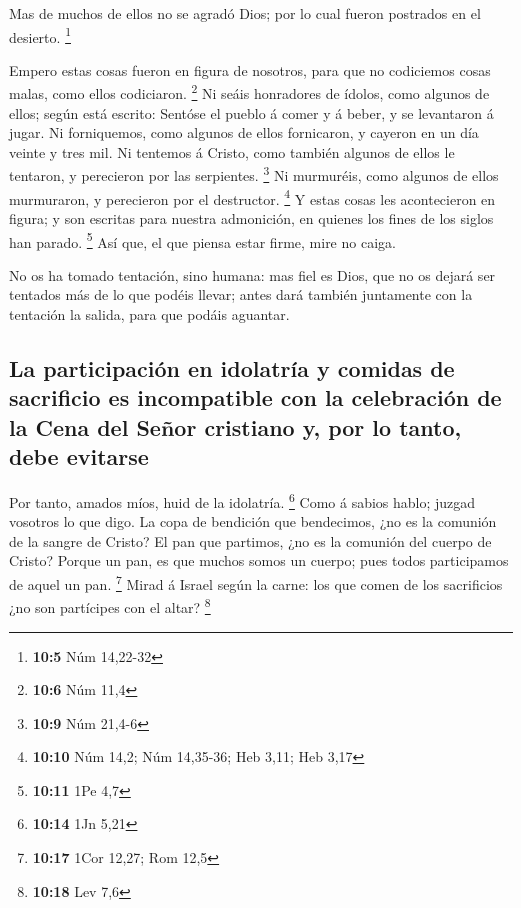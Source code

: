  Mas de muchos de ellos no se agradó Dios; por lo cual
fueron postrados en el desierto. \footnote{\textbf{10:5} Núm 14,22-32}

 Empero estas cosas fueron en figura de nosotros, para que
no codiciemos cosas malas, como ellos codiciaron. \footnote{\textbf{10:6}
  Núm 11,4}  Ni seáis honradores de ídolos, como algunos
de ellos; según está escrito: Sentóse el pueblo á comer y á beber, y se
levantaron á jugar.  Ni forniquemos, como algunos de ellos
fornicaron, y cayeron en un día veinte y tres mil.  Ni
tentemos á Cristo, como también algunos de ellos le tentaron, y
perecieron por las serpientes. \footnote{\textbf{10:9} Núm 21,4-6}
 Ni murmuréis, como algunos de ellos murmuraron, y
perecieron por el destructor. \footnote{\textbf{10:10} Núm 14,2; Núm
  14,35-36; Heb 3,11; Heb 3,17}  Y estas cosas les
acontecieron en figura; y son escritas para nuestra admonición, en
quienes los fines de los siglos han parado. \footnote{\textbf{10:11} 1Pe
  4,7}  Así que, el que piensa estar firme, mire no
caiga.

 No os ha tomado tentación, sino humana: mas fiel es
Dios, que no os dejará ser tentados más de lo que podéis llevar; antes
dará también juntamente con la tentación la salida, para que podáis
aguantar.

\hypertarget{la-participaciuxf3n-en-idolatruxeda-y-comidas-de-sacrificio-es-incompatible-con-la-celebraciuxf3n-de-la-cena-del-seuxf1or-cristiano-y-por-lo-tanto-debe-evitarse}{%
\subsection{La participación en idolatría y comidas de sacrificio es
incompatible con la celebración de la Cena del Señor cristiano y, por lo
tanto, debe
evitarse}\label{la-participaciuxf3n-en-idolatruxeda-y-comidas-de-sacrificio-es-incompatible-con-la-celebraciuxf3n-de-la-cena-del-seuxf1or-cristiano-y-por-lo-tanto-debe-evitarse}}

 Por tanto, amados míos, huid de la idolatría.
\footnote{\textbf{10:14} 1Jn 5,21}  Como á sabios hablo;
juzgad vosotros lo que digo.  La copa de bendición que
bendecimos, ¿no es la comunión de la sangre de Cristo? El pan que
partimos, ¿no es la comunión del cuerpo de Cristo? 
Porque un pan, es que muchos somos un cuerpo; pues todos participamos de
aquel un pan. \footnote{\textbf{10:17} 1Cor 12,27; Rom 12,5}
 Mirad á Israel según la carne: los que comen de los
sacrificios ¿no son partícipes con el altar? \footnote{\textbf{10:18}
  Lev 7,6}

